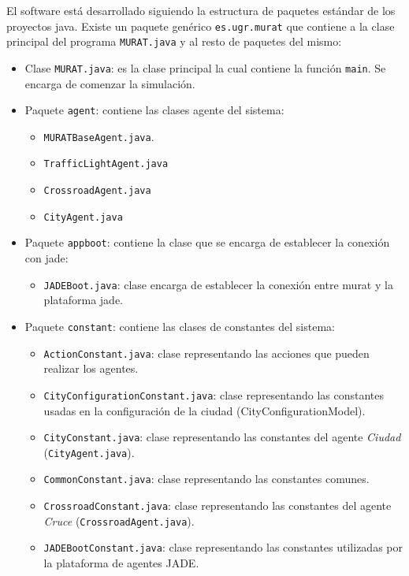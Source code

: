 El software está desarrollado siguiendo la estructura de paquetes estándar de los proyectos \Gls{java}. Existe un paquete genérico \lstinline{es.ugr.murat} que contiene a la clase principal del programa \lstinline{MURAT.java} y al resto de paquetes del mismo:
\begin{itemize}
    \item Clase \lstinline{MURAT.java}: es la clase principal la cual contiene la función \lstinline{main}. Se encarga de comenzar la simulación.
    \item Paquete \lstinline{agent}: contiene las clases agente del sistema:
    \begin{itemize}
        \item \lstinline{MURATBaseAgent.java}.
        \item \lstinline{TrafficLightAgent.java}
        \item \lstinline{CrossroadAgent.java}
        \item \lstinline{CityAgent.java}
    \end{itemize}
    \item Paquete \lstinline{appboot}: contiene la clase que se encarga de establecer la conexión con \acrshort{jade}:  
    \begin{itemize}
        \item \lstinline{JADEBoot.java}: clase encarga de establecer la conexión entre \acrshort{murat} y la plataforma \acrshort{jade}.
    \end{itemize}
    \item Paquete \lstinline{constant}: contiene las clases de constantes del sistema:
    \begin{itemize}
        \item \lstinline{ActionConstant.java}: clase representando las acciones que pueden realizar los agentes.
        \item \lstinline{CityConfigurationConstant.java}: clase representando las constantes usadas en la configuración de la ciudad (CityConfigurationModel).
        \item \lstinline{CityConstant.java}: clase representando las constantes del agente \textit{Ciudad} (\lstinline{CityAgent.java}).
        \item \lstinline{CommonConstant.java}: clase representando las constantes comunes.
        \item \lstinline{CrossroadConstant.java}: clase representando las constantes del agente \textit{Cruce} (\lstinline{CrossroadAgent.java}).
        \item \lstinline{JADEBootConstant.java}: clase representando las constantes utilizadas por la plataforma de agentes JADE.

\end{itemize}
\end{itemize}

